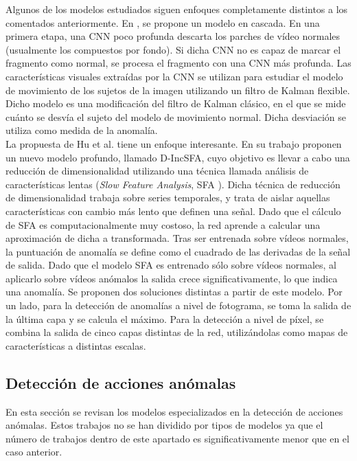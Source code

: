 \documentclass[../main.tex]{memoir}
\begin{document}
Algunos de los modelos estudiados siguen enfoques completamente
distintos a los comentados anteriormente. En \cite{kumar2017d}, se
propone un modelo en cascada. En una primera etapa, una CNN poco
profunda descarta los parches de vídeo normales (usualmente los
compuestos por fondo). Si dicha CNN no es capaz de marcar el fragmento
como normal, se procesa el fragmento con una CNN más profunda. Las
características visuales extraídas por la CNN se utilizan para
estudiar el modelo de movimiento de los sujetos de la imagen
utilizando un filtro de Kalman flexible. Dicho modelo es una
modificación del filtro de Kalman clásico, en el que se mide cuánto se
desvía el sujeto del modelo de movimiento normal. Dicha desviación
se utiliza como medida de la anomalía.\\

La propuesta de Hu et al. tiene un enfoque interesante. En su trabajo
proponen un nuevo modelo profundo, llamado D-IncSFA, cuyo objetivo es
llevar a cabo una reducción de dimensionalidad utilizando una técnica
llamada análisis de características lentas (\textit{Slow Feature
  Analysis}, SFA \cite{wiskott2002slow}). Dicha técnica de reducción
de dimensionalidad trabaja sobre series temporales, y trata de aislar
aquellas características con cambio más lento que definen una señal.
Dado que el cálculo de SFA es computacionalmente muy costoso, la red
aprende a calcular una aproximación de dicha a transformada. Tras ser
entrenada sobre vídeos normales, la puntuación de anomalía se define
como el cuadrado de las derivadas de la señal de salida. Dado que
el modelo SFA es entrenado sólo sobre vídeos normales, al aplicarlo
sobre vídeos anómalos la salida crece significativamente, lo que
indica una anomalía. Se proponen dos soluciones distintas a partir
de este modelo. Por un lado, para la detección de anomalías a nivel
de fotograma, se toma la salida de la última capa y se calcula el
máximo. Para la detección a nivel de píxel, se combina la salida
de cinco capas distintas de la red, utilizándolas como mapas de
características a distintas escalas.

\subsection{Detección de acciones anómalas}
\label{sec:action-revision}

En esta sección se revisan los modelos especializados en la detección
de acciones anómalas. Estos trabajos no se han dividido por tipos de
modelos ya que el número de trabajos dentro de este apartado es
significativamente menor que en el caso anterior.\\
\end{document}
